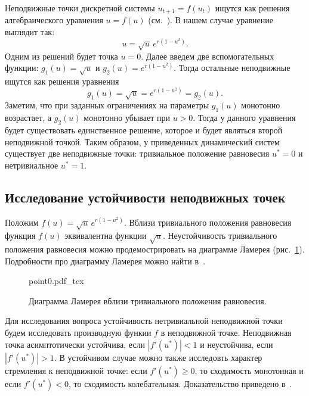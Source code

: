 \documentclass[12pt, a4paper]{article} %
\newcommand{\incfig}[1]{%
    \def\svgwidth{\columnwidth}
    {#1.pdf_tex}
}
\renewcommand{\ge}{\geqslant}
\begin{document}
Неподвижные точки дискретной системы $u_{t+1}=f(u_t)$ ищутся как решения
алгебраического уравнения $u = f(u)$ (см.~\cite{Bratus}).
В нашем случае уравнение выглядит так:
\begin{equation}
    u = \sqrt{u}\,e^{r(1 - u^2)}
.\end{equation}
Одним из решений будет точка $u = 0$.
Далее введем две вспомогательных функции:  $g_1(u) = \sqrt{u}$ и 
$g_2(u) = e^{r(1 - u^2)}$.
Тогда остальные неподвижные ищутся как решения уравнения 
\begin{equation}
    g_1(u) = \sqrt{u}= e^{r(1 - u^2)} = g_2(u)
.\end{equation} 
Заметим, что при заданных ограничениях на параметры $g_1(u)$ монотонно 
возрастает, а  $g_2(u)$ монотонно убывает при  $u > 0$.
Тогда у данного уравнения будет существовать единственное решение, 
которое и будет являться второй неподвижной точкой. 
Таким образом, у приведенных динамический систем существует две неподвижные 
точки: тривиальное положение равновесия $u^* = 0$ и нетривиальное  $u^*=1$. 

\subsection{Исследование устойчивости неподвижных точек}

Положим $f(u) = \sqrt{u}\,e^{r(1 - u^2)}$.
Вблизи тривиального положения равновесия функция $f(u)$ эквивалентна функции 
$\sqrt{u}$. 
Неустойчивость тривиального положения равновесия можно продемострировать
на диаграмме Ламерея (рис.~\ref{fig:point0}). 
Подробности про диаграмму Ламерея можно найти в~\cite[с.~72]{Bratus}.

\begin{figure}[ht]
    \centering
    \incfig{point0}
    \caption{Диаграмма Ламерея вблизи тривиального положения равновесия.}
    \label{fig:point0}
\end{figure}

Для исследования вопроса устойчивость нетривиальной неподвижной точки 
будем исследовать производную функии $f$ в неподвижной точке.
Неподвижная точка асимптотически устойчива, если 
$\left| f'(u^*) \right| < 1$ и неустойчива, если $\left| f'(u^*) \right| > 1$.
В устойчивом случае можно также исследовть характер стремления к неподвижной точке: если $f'(u^*) \ge 0$, то сходимость монотонная и если  $f'(u^*) < 0$, то сходимость колебательная.
Доказательство приведено в~\cite[с.~83]{Bratus}.
\end{document}
